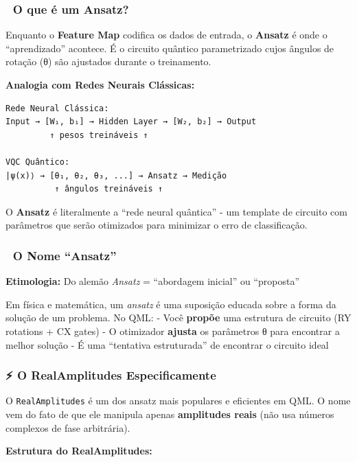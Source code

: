 \documentclass[
  brazilian,
]{report}
\begin{document}
\subsubsection{🧠 O que é um Ansatz?}\label{o-que-uxe9-um-ansatz}

Enquanto o \textbf{Feature Map} codifica os dados de entrada, o
\textbf{Ansatz} é onde o ``aprendizado'' acontece. É o circuito quântico
parametrizado cujos ângulos de rotação (θ) são ajustados durante o
treinamento.

\textbf{Analogia com Redes Neurais Clássicas:}

\begin{verbatim}
Rede Neural Clássica:
Input → [W₁, b₁] → Hidden Layer → [W₂, b₂] → Output
         ↑ pesos treináveis ↑

VQC Quântico:
|ψ(x)⟩ → [θ₁, θ₂, θ₃, ...] → Ansatz → Medição
          ↑ ângulos treináveis ↑
\end{verbatim}

O \textbf{Ansatz} é literalmente a ``rede neural quântica'' - um
template de circuito com parâmetros que serão otimizados para minimizar
o erro de classificação.

\subsubsection{🎯 O Nome ``Ansatz''}\label{o-nome-ansatz}

\textbf{Etimologia:} Do alemão \emph{Ansatz} = ``abordagem inicial'' ou
``proposta''

Em física e matemática, um \emph{ansatz} é uma suposição educada sobre a
forma da solução de um problema. No QML: - Você \textbf{propõe} uma
estrutura de circuito (RY rotations + CX gates) - O otimizador
\textbf{ajusta} os parâmetros θ para encontrar a melhor solução - É uma
``tentativa estruturada'' de encontrar o circuito ideal

\subsubsection{⚡ O RealAmplitudes
Especificamente}\label{o-realamplitudes-especificamente}

O \texttt{RealAmplitudes} é um dos ansatz mais populares e eficientes em
QML. O nome vem do fato de que ele manipula apenas \textbf{amplitudes
reais} (não usa números complexos de fase arbitrária).

\textbf{Estrutura do RealAmplitudes:}
\end{document}
